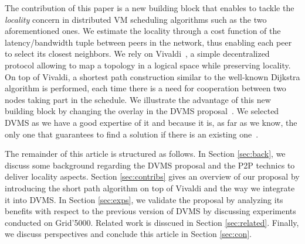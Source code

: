 The contribution of this paper is a new building block that enables to tackle the
\emph{locality} concern in distributed VM scheduling algorithms such as the two
aforementioned ones.
We estimate the locality through a cost function of the latency/bandwidth tuple between
peers in the network, thus enabling each peer to select its closest neighbors. We rely on
Vivaldi~\cite{dabek:2001:sigcomm04}, a simple decentralized protocol allowing to map a
topology in a logical space while preserving locality. On top of Vivaldi, a shortest path
construction similar to the well-known Dijkstra algorithm is performed, each time there is
a need for cooperation between two nodes taking part in the schedule. We illustrate the
advantage of this new building block by changing the overlay in the DVMS
proposal~\cite{quesnel:cpe2012}. We selected DVMS as we have a good expertise of it and
because it is, as far as we know, the only one that guarantees to find a solution if there
is an existing one~\cite{quesnel:ispa2013}.
                                                   
The remainder of this article is structured as follows. In Section \ref{sec:back}, we
discuss some background regarding the DVMS proposal and the P2P technics to deliver
locality aspects. Section \ref{sec:contribs} gives an overview of our proposal by
introducing the short path algorithm on top of Vivaldi and the way we integrate it into
DVMS. In Section \ref{sec:exps}, we validate the proposal by analyzing its benefits with
respect to the previous version of DVMS by discussing experiments conducted on
Grid'5000. Related work is disscued in Section \ref{sec:related}. Finally, we discuss
perspectives and conclude this article in Section \ref{sec:con}.

